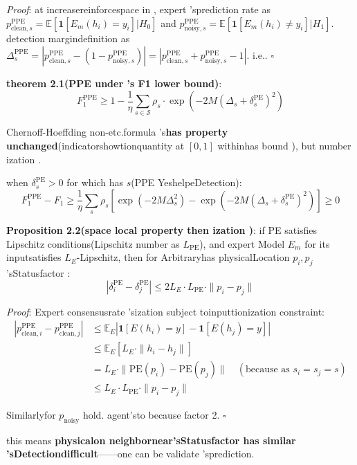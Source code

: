 \documentclass[
  12pt,
]{article}
\begin{document}
\emph{Proof}: at increasereinforcespace in , expert 'sprediction rate as 
\(p_{\text{clean},s}^{\text{PPE}} = \mathbb{E}[\mathbf{1}[E_m(h_i) = y_i] | H_0]\)
and 
\(p_{\text{noisy},s}^{\text{PPE}} = \mathbb{E}[\mathbf{1}[E_m(h_i) \neq y_i] | H_1]\). detection margindefinition as 
\(\Delta_s^{\text{PPE}} = |p_{\text{clean},s}^{\text{PPE}} - (1 - p_{\text{noisy},s}^{\text{PPE}})| = |p_{\text{clean},s}^{\text{PPE}} + p_{\text{noisy},s}^{\text{PPE}} - 1|\). i.e.. \(\square\)

\textbf{theorem  2.1(PPE under 's F1 lower bound)}: 
\[\boxed{F_1^{\text{PPE}} \geq 1 - \frac{1}{\eta} \sum_{s \in \mathcal{S}} \rho_s \cdot \exp\left(-2M (\Delta_s + \delta_s^{\text{PE}})^2\right)}\]

Chernoff-Hoeffding non-etc.formula 's\textbf{has property unchanged}(indicatorshowtionquantity at  \([0,1]\)
withinhas bound ), but number ization . 

when  \(\delta_s^{\text{PE}} > 0\) for which has  \(s\)(PPE YeshelpeDetection):
\[F_1^{\text{PPE}} - F_1 \geq \frac{1}{\eta} \sum_s \rho_s \left[\exp(-2M\Delta_s^2) - \exp(-2M(\Delta_s + \delta_s^{\text{PE}})^2)\right] \geq 0\]

\textbf{Proposition 2.2(space local property then ization )}: if  PE satisfies  Lipschitz
conditions(Lipschitz number as  \(L_{\text{PE}}\)), and expert Model \(E_m\)
for its inputsatisfies  \(L_E\)-Lipschitz, then for Arbitraryhas physicalLocation \(p_i, p_j\)
'sStatusfactor : 
\[|\delta_i^{\text{PE}} - \delta_j^{\text{PE}}| \leq 2L_E \cdot L_{\text{PE}} \cdot \|p_i - p_j\|\]

\emph{Proof}: Expert consensusrate 'sization subject toinputtionization constraint:  \begin{align*}
|p_{\text{clean},i}^{\text{PPE}} - p_{\text{clean},j}^{\text{PPE}}|
&\leq \mathbb{E}_{E} \left|\mathbf{1}[E(h_i) = y] - \mathbf{1}[E(h_j) = y]\right| \\
&\leq \mathbb{E}_{E} \left[ L_E \cdot \|h_i - h_j\| \right] \\
&= L_E \cdot \|\text{PE}(p_i) - \text{PE}(p_j)\| \quad (\text{because as  } s_i = s_j = s) \\
&\leq L_E \cdot L_{\text{PE}} \cdot \|p_i - p_j\|
\end{align*}

Similarlyfor  \(p_{\text{noisy}}\) hold. agent'sto because factor  2. \(\square\)

this means \textbf{physicalon neighbornear'sStatusfactor has similar 'sDetectiondifficult}------one can be validate 'sprediction. 
\end{document}
